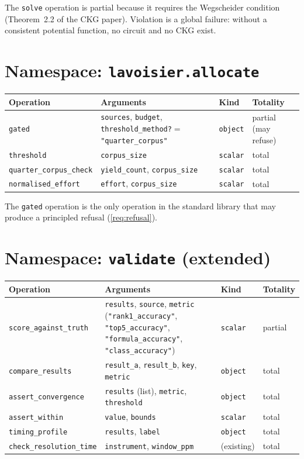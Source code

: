 \documentclass[11pt,a4paper]{article}
\theoremstyle{planstyle}
\theoremstyle{definition}
\theoremstyle{remark}
\newcommand{\shk}[1]{\texttt{#1}}
\begin{document}
The \shk{solve} operation is partial because it requires the Wegscheider
condition (Theorem~2.2 of the CKG paper). Violation is a global failure:
without a consistent potential function, no circuit and no CKG exist.

\section{Namespace: \texttt{lavoisier.allocate}}
\label{sec:ns-allocate}

\begin{longtable}{@{}p{3.8cm}p{5.5cm}p{1.8cm}p{1.5cm}@{}}
\toprule
\textbf{Operation} & \textbf{Arguments} & \textbf{Kind} & \textbf{Totality} \\
\midrule
\endhead
\shk{gated} & \shk{sources}, \shk{budget},
  \shk{threshold\_method?}$=$\shk{"quarter\_corpus"} &
  \shk{object} & partial (may refuse) \\
\shk{threshold} & \shk{corpus\_size} & \shk{scalar} & total \\
\shk{quarter\_corpus\_check} & \shk{yield\_count}, \shk{corpus\_size} &
  \shk{scalar} & total \\
\shk{normalised\_effort} & \shk{effort}, \shk{corpus\_size} &
  \shk{scalar} & total \\
\bottomrule
\end{longtable}

The \shk{gated} operation is the only operation in the standard library
that may produce a principled refusal (\cref{req:refusal}).

\section{Namespace: \texttt{validate} (extended)}
\label{sec:ns-validate}

\begin{longtable}{@{}p{3.8cm}p{5.5cm}p{1.8cm}p{1.5cm}@{}}
\toprule
\textbf{Operation} & \textbf{Arguments} & \textbf{Kind} & \textbf{Totality} \\
\midrule
\endhead
\shk{score\_against\_truth} & \shk{results}, \shk{source}, \shk{metric}
  (\shk{"rank1\_accuracy"}, \shk{"top5\_accuracy"}, \shk{"formula\_accuracy"},
  \shk{"class\_accuracy"}) & \shk{scalar} & partial \\
\shk{compare\_results} & \shk{result\_a}, \shk{result\_b}, \shk{key},
  \shk{metric} & \shk{object} & total \\
\shk{assert\_convergence} & \shk{results} (list), \shk{metric},
  \shk{threshold} & \shk{object} & total \\
\shk{assert\_within} & \shk{value}, \shk{bounds} & \shk{scalar} & total \\
\shk{timing\_profile} & \shk{results}, \shk{label} & \shk{object} & total \\
\shk{check\_resolution\_time} & \shk{instrument}, \shk{window\_ppm} &
  (existing) & total \\
\bottomrule
\end{longtable}
\end{document}
